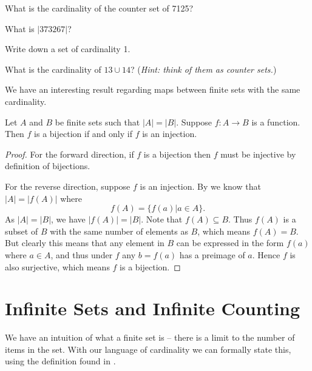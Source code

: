 \begin{exercise}
    \begin{partquestions}{\alph*}
        \item What is the cardinality of the counter set of 7125?
        \item What is $|373267|$?
        \item Write down a set of cardinality 1.
        \item What is the cardinality of $13 \cup 14$?\newline
        (\textit{Hint: think of them as counter sets.})
    \end{partquestions}
\end{exercise}

We have an interesting result regarding maps between finite sets with the same cardinality.

\begin{theorem}\label{theorem:map-between-finite-sets-of-equal-cardinality}
    Let $A$ and $B$ be finite sets such that $|A| = |B|$. Suppose $f: A \to B$ is a function. Then $f$ is a bijection if and only if $f$ is an injection.
\end{theorem}
\begin{proof}
    For the forward direction, if $f$ is a bijection then $f$ must be injective by definition of bijections.
    
    For the reverse direction, suppose $f$ is an injection. By  we know that $|A| = |f(A)|$ where
    \[
        f(A) = \{f(a) \vert a \in A\}.
    \]
    As $|A| = |B|$, we have $|f(A)| = |B|$. Note that $f(A) \subseteq B$. Thus $f(A)$ is a subset of $B$ with the same number of elements as $B$, which means $f(A) = B$. But clearly this means that any element in $B$ can be expressed in the form $f(a)$ where $a \in A$, and thus under $f$ any $b = f(a)$ has a preimage of $a$. Hence $f$ is also surjective, which means $f$ is a bijection.
\end{proof}

\section{Infinite Sets and Infinite Counting}
We have an intuition of what a finite set is -- there is a limit to the number of items in the set. With our language of cardinality we can formally state this, using the definition found in \cite[p.~262]{boolos_1998}.

